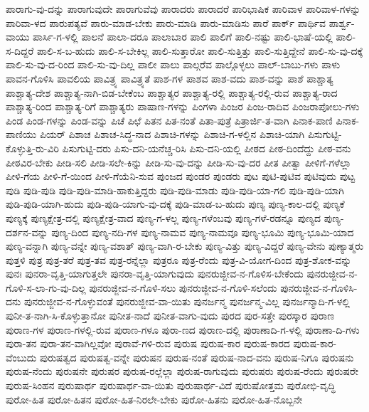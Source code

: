 ಪಾರಾಗು-ವು-ದನ್ನು
ಪಾರಾಗುವುದೇ
ಪಾರಾಗುವೆವು
ಪಾರಾದರು
ಪಾರಾದರೆ
ಪಾರಿಭಾಷಿಕ
ಪಾರಿವಾಳ
ಪಾರಿವಾಳ-ಗಳನ್ನು
ಪಾರಿವಾ-ಳದ
ಪಾರುಪತ್ಯವೆ
ಪಾರು-ಮಾಡ-ಬೇಕು
ಪಾರು-ಮಾಡಿ
ಪಾರು-ಮಾಡಿಸು
ಪಾರೆ
ಪಾರ್ಕ್
ಪಾರ್ಥಿವ
ಪಾರ್ಶ್ವ-ವಾಯು
ಪಾರ್ಸಿ-ಗ-ಳಲ್ಲಿ
ಪಾಲನೆ
ಪಾಲಾ-ದರೂ
ಪಾಲಾಬಾರ
ಪಾಲಿ
ಪಾಲಿಗೆ
ಪಾಲಿ-ನಷ್ಟು
ಪಾಲಿ-ಭಾಷೆ-ಯಲ್ಲಿ
ಪಾಲಿ-ಸ-ದಿದ್ದರೆ
ಪಾಲಿ-ಸ-ಬ-ಹುದು
ಪಾಲಿ-ಸ-ಬೇಕಿಲ್ಲ
ಪಾಲಿ-ಸುತ್ತಾರೋ
ಪಾಲಿ-ಸುತ್ತಿತ್ತು
ಪಾಲಿ-ಸುತ್ತಿದ್ದೇನೆ
ಪಾಲಿ-ಸು-ವು-ದಕ್ಕೆ
ಪಾಲಿ-ಸು-ವು-ದ-ರಿಂದ
ಪಾಲಿ-ಸು-ವು-ದಿಲ್ಲ
ಪಾಲೀ
ಪಾಲು
ಪಾಲ್ಗರೆವ
ಪಾಲ್ಗೊಳ್ಳಲು
ಪಾಲ್‌-ಬಾಬು-ಗಳು
ಪಾಳು
ಪಾವನ-ಗೊಳಿಸಿ
ಪಾವಲಿಯ
ಪಾವಿತ್ರ್ಯ
ಪಾವಿತ್ರ್ಯತೆ
ಪಾಶ-ಗಳ
ಪಾಶವ
ಪಾಶ-ವದು
ಪಾಶ-ವನ್ನು
ಪಾಶೆ
ಪಾಶ್ಚಾತ್ಯ
ಪಾಶ್ಚಾತ್ಯ-ದೇಶ
ಪಾಶ್ಚಾತ್ಯ-ನಾಗಿ-ಬಿಡ-ಬೇಕೆಂಬ
ಪಾಶ್ಚಾತ್ಯರ
ಪಾಶ್ಚಾತ್ಯ-ರಲ್ಲಿ
ಪಾಶ್ಚಾತ್ಯ-ರಲ್ಲಿ-ರುವ
ಪಾಶ್ಚಾತ್ಯ-ರಾದ
ಪಾಶ್ಚಾತ್ಯ-ರಿಂದ
ಪಾಶ್ಚಾತ್ಯ-ರಿಗೆ
ಪಾಶ್ಚಾತ್ಯರು
ಪಾಷಾಣ-ಗಳನ್ನು
ಪಿಂಗಳಾ
ಪಿಂಜರ
ಪಿಂಜ-ರಾದಿವ
ಪಿಂಜರಾಪೋಲು-ಗಳು
ಪಿಂಡ
ಪಿಂಡ-ಗಳನ್ನು
ಪಿಂಡ-ವನ್ನು
ಪಿಚೆ
ಪಿಛೆ
ಪಿತನ
ಪಿತ-ನಂತೆ
ಪಿತಾ-ಪುತ್ರೆ
ಪಿತ್ರಾರ್ಜಿ-ತ-ವಾಗಿ
ಪಿನಾಕ-ಪಾಣಿ
ಪಿನಾಕ-ಪಾಣಿಯು
ಪಿಯರ್
ಪಿಶಾಚ
ಪಿಶಾಚ-ಸಿದ್ಧ-ನಾದ
ಪಿಶಾಚಿ-ಗಳನ್ನು
ಪಿಶಾಚಿ-ಗ-ಳಲ್ಲಿನ
ಪಿಶಾಚಿ-ಯಾಗಿ
ಪಿಸುಗುಟ್ಟಿ-ಕೊಳ್ಳುತ್ತಿ-ರು-ವಿರಿ
ಪಿಸುಗುಟ್ಟಿ-ದರು
ಪಿಸು-ದನಿ-ಯನೆಚ್ಚ-ರಿಸಿ
ಪಿಸು-ದನಿ-ಯಲ್ಲಿ
ಪೀಠದ
ಪೀಠ-ದಿಂದೆದ್ದು
ಪೀಠ-ವನು
ಪೀಠವಿರ-ಬೇಕು
ಪೀಡಿ-ಸಲಿ
ಪೀಡಿ-ಸಲೇ-ಕಿನ್ನು
ಪೀಡಿ-ಸು-ವು-ದನ್ನು
ಪೀಡಿ-ಸು-ವು-ದರ
ಪೀತ
ಪೀತ್ವಾ
ಪೀಳಿಗೆ-ಗಳೆಲ್ಲಾ
ಪೀಳಿ-ಗೆಯ
ಪೀಳಿ-ಗೆ-ಯಿಂದ
ಪೀಳಿ-ಗೆಯೆನಿ-ಸುವ
ಪುಂಜದ
ಪುಂಡರ
ಪುಂಡರು
ಪುಟ
ಪುಟಿ-ಪುಟಿವ
ಪುಟಿವುದು
ಪುಟ್ಟ
ಪುಡಿ
ಪುಡಿ-ಪುಡಿ
ಪುಡಿ-ಪುಡಿ-ಮಾಡಿ-ಹಾಕುತ್ತಿದ್ದರು
ಪುಡಿ-ಪುಡಿ-ಮಾಡು
ಪುಡಿ-ಪುಡಿ-ಯಾ-ಗಲಿ
ಪುಡಿ-ಪುಡಿ-ಯಾಗಿ
ಪುಡಿ-ಪುಡಿ-ಯಾಗಿ-ಹುದು
ಪುಡಿ-ಪುಡಿ-ಯಾಗು-ವು-ದಕ್ಕೆ
ಪುಡಿ-ಮಾಡ-ಬ-ಹುದು
ಪುಣ್ಯ
ಪುಣ್ಯ-ಕಾಲ-ದಲ್ಲಿ
ಪುಣ್ಯಕೆ
ಪುಣ್ಯಕ್ಕೆ
ಪುಣ್ಯಕ್ಷೇತ್ರ-ದಲ್ಲಿ
ಪುಣ್ಯಕ್ಷೇತ್ರ-ವಾದ
ಪುಣ್ಯ-ಗ-ಳಲ್ಲ
ಪುಣ್ಯ-ಗಳೆಂಬವು
ಪುಣ್ಯ-ಗಳೆ-ರಡನ್ನೂ
ಪುಣ್ಯದ
ಪುಣ್ಯ-ದರ್ಶನ-ವನ್ನು
ಪುಣ್ಯ-ದಿಂದ
ಪುಣ್ಯ-ನದಿ-ಗಳ
ಪುಣ್ಯ-ನಾಮವ
ಪುಣ್ಯ-ನಾಮವೂ
ಪುಣ್ಯ-ಭೂಮಿ
ಪುಣ್ಯ-ಭೂಮಿ-ಯಾದ
ಪುಣ್ಯ-ವನ್ನಾಗಿ
ಪುಣ್ಯ-ವನ್ನೇ
ಪುಣ್ಯ-ವಶಾತ್
ಪುಣ್ಯ-ವಾಗಿ-ರ-ಬೇಕು
ಪುಣ್ಯ-ವಿತ್ತು
ಪುಣ್ಯ-ವಿದ್ದರೆ
ಪುಣ್ಯ-ವೇನು
ಪುಣ್ಯಾತ್ಮರು
ಪುತ್ತಳಿ
ಪುತ್ರ
ಪುತ್ರ-ತರೆ
ಪುತ್ರ-ತವ
ಪುತ್ರ-ರನ್ನೆಲ್ಲಾ
ಪುತ್ರರೂ
ಪುತ್ರ-ರೆಂದು
ಪುತ್ರ-ವಿ-ಯೋಗ-ದಿಂದ
ಪುತ್ರ-ಶೋಕ-ವನ್ನು
ಪುನಃ
ಪುನರಾ-ವೃತ್ತಿ-ಯಾಗುತ್ತಲೇ
ಪುನರಾ-ವೃತ್ತಿ-ಯಾಗುವುದು
ಪುನರುಜ್ಜೀವ-ನ-ಗೊಳಿಸ-ಬೇಕೆಂದು
ಪುನರುಜ್ಜೀವ-ನ-ಗೊಳಿ-ಸ-ಲಾ-ಗು-ವು-ದಿಲ್ಲ
ಪುನರುಜ್ಜೀವ-ನ-ಗೊಳಿ-ಸಲು
ಪುನರುಜ್ಜೀವ-ನ-ಗೊಳಿ-ಸಲೆಂದು
ಪುನರುಜ್ಜೀವ-ನ-ಗೊಳಿಸಿ-ದನು
ಪುನರುಜ್ಜೀವ-ನ-ಗೊಳ್ಳುವಂತೆ
ಪುನರುಜ್ಜೀವ-ವಾ-ಯಿತು
ಪುನರ್ಜನ್ಮ
ಪುನರ್ಜನ್ಮ-ವಿಲ್ಲ
ಪುನರ್ಜನ್ಮಾದಿ-ಗ-ಳಲ್ಲಿ
ಪುನೀ-ತ-ನಾಗಿ-ಸಿ-ಕೊಳ್ಳುತ್ತಾನೋ
ಪುನೀತ-ನಾದೆ
ಪುನೀತ-ವಾಗು-ವುದು
ಪುರದ
ಪುರ-ಸತ್ತೇ
ಪುರಸ್ಕಾರ
ಪುರಾಣ
ಪುರಾಣ-ಗಳ
ಪುರಾಣ-ಗಳಲ್ಲಿ-ರುವ
ಪುರಾಣ-ಗಳೂ
ಪುರಾ-ಣದ
ಪುರಾಣ-ದಲ್ಲಿ
ಪುರಾಣಾದಿ-ಗ-ಳಲ್ಲಿ
ಪುರಾಣಾ-ದಿ-ಗಳು
ಪುರಾ-ತನ
ಪುರಾ-ತನ-ವಾಗಿಲ್ಲವೋ
ಪುರಾವೆ-ಗಳಿ-ರುವ
ಪುರುಷ
ಪುರುಷ-ಕಾರ
ಪುರುಷ-ಕಾರದ
ಪುರುಷ-ಕಾರ-ವೆಂಬುದು
ಪುರುಷತ್ವದ
ಪುರುಷತ್ವ-ವನ್ನೇ
ಪುರುಷನ
ಪುರುಷ-ನಂತೆ
ಪುರುಷ-ನಾದ-ವನು
ಪುರುಷ-ನಿಗೂ
ಪುರುಷನು
ಪುರುಷ-ನೆಂದು
ಪುರುಷನೇ
ಪುರುಷರ
ಪುರುಷ-ರಲ್ಲೆಲ್ಲಾ
ಪುರುಷ-ರಾಗುವುದು
ಪುರುಷರು
ಪುರುಷ-ರೆಂದು
ಪುರುಷರೇ
ಪುರುಷ-ಸಿಂಹನ
ಪುರುಷಾರ್ಥ
ಪುರುಷಾರ್ಥ-ವಾ-ಯಿತು
ಪುರುಷಾರ್ಥ-ವಿದೆ
ಪುರುಷೋತ್ತಮ
ಪುರೋಭಿ-ವೃದ್ಧಿ
ಪುರೋ-ಹಿತ
ಪುರೋ-ಹಿತನ
ಪುರೋ-ಹಿತ-ನಿರಲೇ-ಬೇಕು
ಪುರೋ-ಹಿತನು
ಪುರೋ-ಹಿತ-ನೊಬ್ಬನೇ
